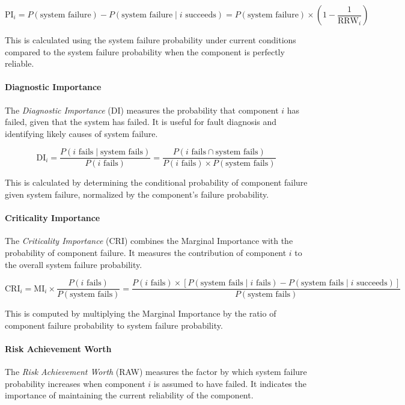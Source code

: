 \[
\text{PI}_i = P(\text{system failure}) - P(\text{system failure} \mid i \text{ succeeds}) = P(\text{system failure}) \times (1 - \frac{1}{\text{RRW}_i})
\]

This is calculated using the system failure probability under current conditions compared to the system failure probability when the component is perfectly reliable.

\paragraph{Diagnostic Importance}
The \emph{Diagnostic Importance} (DI) measures the probability that component $i$ has failed, given that the system has failed. It is useful for fault diagnosis and identifying likely causes of system failure.

\[
\text{DI}_i = \frac{P(i \text{ fails} \mid \text{system fails})}{P(i \text{ fails})} = \frac{P(i \text{ fails} \cap \text{system fails})}{P(i \text{ fails}) \times P(\text{system fails})}
\]

This is calculated by determining the conditional probability of component failure given system failure, normalized by the component's failure probability.

\paragraph{Criticality Importance}
The \emph{Criticality Importance} (CRI) combines the Marginal Importance with the probability of component failure. It measures the contribution of component $i$ to the overall system failure probability.

\[
\text{CRI}_i = \text{MI}_i \times \frac{P(i \text{ fails})}{P(\text{system fails})} = \frac{P(i \text{ fails}) \times [P(\text{system fails} \mid i \text{ fails}) - P(\text{system fails} \mid i \text{ succeeds})]}{P(\text{system fails})}
\]

This is computed by multiplying the Marginal Importance by the ratio of component failure probability to system failure probability.

\paragraph{Risk Achievement Worth}
The \emph{Risk Achievement Worth} (RAW) measures the factor by which system failure probability increases when component $i$ is assumed to have failed. It indicates the importance of maintaining the current reliability of the component.

